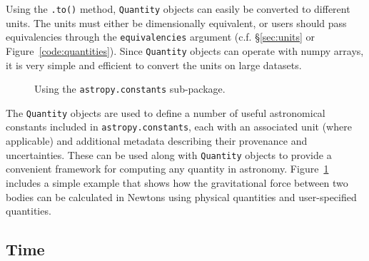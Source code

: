 \documentclass[traditabstract]{aa}
\begin{document}
Using the \texttt{.to()} method, \texttt{Quantity} objects can easily be
converted to different units. The units must either be dimensionally
equivalent, or users should pass equivalencies through the
\texttt{equivalencies} argument (c.f. \S\ref{sec:units} or Figure~\ref{code:quantities}).
Since \texttt{Quantity} objects can operate with \gls{numpy} arrays, it is very simple
and efficient to convert the units on large datasets.

\begin{figure}
\center
\caption{Using the \texttt{astropy.constants} sub-package.\label{code:constants}}
\vspace{0.1in}
\end{figure}

The \texttt{Quantity} objects are used to define a number of useful
astronomical constants included in \texttt{astropy.constants}, each with an associated unit
(where applicable) and additional metadata describing their provenance and
uncertainties. These can be used along with \texttt{Quantity} objects to
provide a convenient framework for computing any quantity in astronomy.
Figure~\ref{code:constants} includes a simple example that shows how the
gravitational force between two bodies can be calculated in Newtons using
physical quantities and user-specified quantities.

\subsection{Time}
\end{document}
